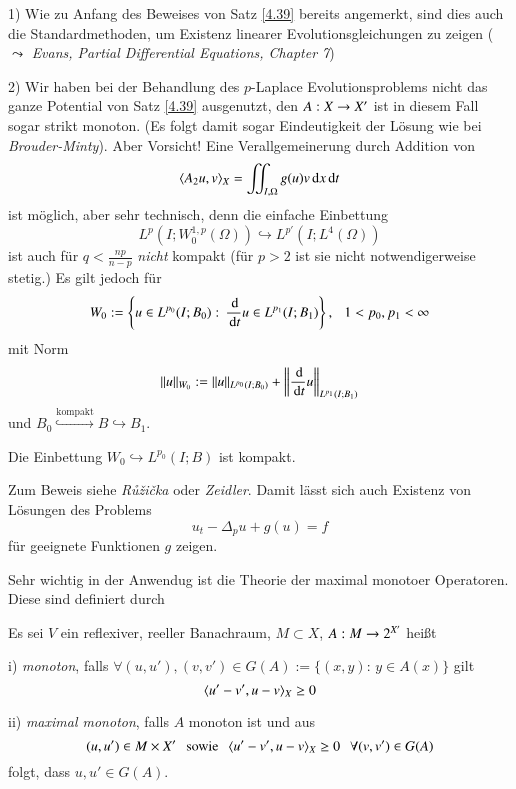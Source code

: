 \begin{remark}
    \begin{description}
    \item{1)}
    Wie zu Anfang des Beweises von Satz \ref{4.39} bereits angemerkt, sind dies auch die
    Standardmethoden, um Existenz linearer Evolutionsgleichungen zu zeigen ($\leadsto$ \textit{Evans,
    Partial Differential Equations, Chapter 7})
    \item{2)}
    Wir haben bei der Behandlung des $p$-Laplace Evolutionsproblems nicht das ganze Potential von Satz
    \ref{4.39} ausgenutzt, den $A:X\rightarrow X'$ ist in diesem Fall sogar strikt monoton. (Es folgt damit sogar
    Eindeutigkeit der Lösung wie bei \textit{Brouder-Minty}). Aber Vorsicht! Eine Verallgemeinerung durch
    Addition von
    \[
        \langle A_2u,v\rangle_X = \iint_{I,\Omega} g(u)v\, \mathrm{d} x \, \mathrm{d} t
    \]
    ist möglich, aber sehr technisch, denn die einfache Einbettung
    \[
        L^p(I;W_0^{1,p}(\Omega))\hookrightarrow L^{p'}(I;L^4(\Omega))
    \]
    ist auch für $q<\frac{np}{n-p}$ \textit{nicht} kompakt (für $p>2$ ist sie nicht notwendigerweise
    stetig.) Es gilt jedoch für 
    \[
        W_0:= \left\{ u\in L^{p_0}(I;B_0):\, \frac{\, \mathrm{d}}{\, \mathrm{d} t} u \in L^{p_1}(I; B_1)\right\}, \hspace{.25cm}
        1<p_0,p_1<\infty
    \]
    mit Norm
    \[
        \|u\|_{W_0}:= \|u\|_{L^{p_0}(I;B_0)} + \left\|\frac{\, \mathrm{d}}{\, \mathrm{d} t} u \right\|_{L^{p_1}(I;B_1)}
    \]
    und $B_0\overset{\text{kompakt}}{\hookrightarrow} B\hookrightarrow B_1$.
    \end{description}
\end{remark}

\begin{lem}\label{4.43}
    Die Einbettung $W_0\hookrightarrow L^{p_0}(I;B)$ ist kompakt.
\end{lem}

Zum Beweis siehe \textit{Růžička} oder \textit{Zeidler}. Damit lässt sich auch Existenz von Lösungen des
Problems
\[
    u_t-\Delta_pu+g(u)=f
\]
für geeignete Funktionen $g$ zeigen.

\begin{remark}
    Sehr wichtig in der Anwendug ist die Theorie der maximal monotoer Operatoren. Diese sind definiert
    durch
    \begin{defi}\label{4.44}
    Es sei $V$ ein reflexiver, reeller Banachraum, $M\subset X$, $A:M\rightarrow 2^{X'}$ heißt
    \begin{description}
        \item{i)}
        \textit{monoton}, falls $\forall (u,u'),(v,v')\in G(A):= \{(x,y): \,y\in A(x) \}$ gilt
        \[
            \langle u'-v',u-v \rangle_X \geq 0
        \]
        \item{ii)}
        \textit{maximal monoton}, falls $A$ monoton ist und aus
        \[
            (u,u')\in M\times X' \hspace{.25cm} \text{sowie} \hspace{.25cm}
            \langle u'-v',u-v\rangle_X\geq 0 \hspace{.25cm} \forall (v,v')\in G(A) 
        \]
        folgt, dass $u,u'\in G(A)$.
    \end{description}
    \end{defi}
\end{remark}


